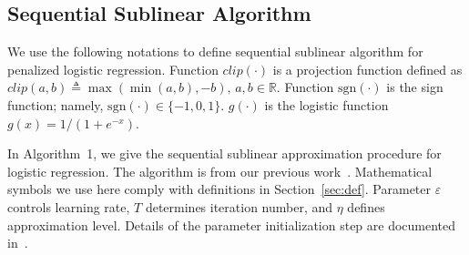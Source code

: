 \documentclass[10pt, conference, compsocconf]{IEEEtran}
\newcommand{\lc}{\left(}
\newcommand{\rc}{\right)}
\def\sgn{\mathrm{sgn}}
\begin{document}
\subsection{Sequential Sublinear Algorithm}
We use the following notations to define sequential sublinear algorithm for penalized logistic regression. Function $clip\lc \cdot \rc$ is a projection function defined as $
clip\lc a,b \rc \triangleq \max \lc \min \lc a,b \rc ,-b\rc,\,a,b\in \mathbb{R}$.
Function $\sgn \lc \cdot \rc$ is the sign function; namely, $\sgn \lc \cdot \rc \in \{-1,0,1\}$.
$g\lc \cdot \rc$ is the logistic function $g \lc x \rc=1/(1+e^{-x})$.

In Algorithm~1, we give the sequential sublinear approximation procedure for logistic regression. The algorithm is from our previous work~\cite{peng2012sublinear}. Mathematical symbols we use here comply with definitions in Section~\ref{sec:def}. Parameter $\varepsilon$ controls learning rate, $T$ determines iteration number, and $\eta$ defines approximation level. Details of the parameter initialization step are documented in~\cite{peng2012sublinear}.
\end{document}
